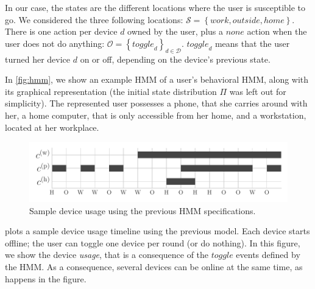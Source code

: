 In our case, the states are the different locations where the user is susceptible to go.
We considered the three following locations: $\mathcal{S}=\left\{ \mathit{work}, \mathit{outside}, \mathit{home} \right\}$. 
There is one action per device $d$ owned by the user, plus a $\mathit{none}$ action when the user does not do anything: 
$\mathcal{O} = \left\{ \mathit{toggle}_d \right\}_{d\in \mathcal{D}}$.
$\mathit{toggle}_d$ means that the user turned her device $d$ on or off, depending on the device's previous state.

In \cref{fig:hmm}, we show an example HMM of a user's behavioral HMM, along with its graphical representation (the initial state distribution $\Pi$ was left out for simplicity). 
The represented user possesses a phone, that she carries around with her, a home computer, that is only accessible from her home, and a workstation, located at her workplace.

\begin{figure}[t]
\centering
\includegraphics[width=\columnwidth]{figures/sample_usage.pdf}

\caption{\label{fig:sample_usage}Sample device usage using the previous HMM specifications. 
}
\end{figure}


 plots a sample device usage timeline using the previous model. 
Each device starts offline; the user can toggle one device per round (or do nothing).
In this figure, we show the device \emph{usage}, that is a consequence of the $\mathit{toggle}$ events defined by the HMM.
As a consequence, several devices can be online at the same time, as happens in the figure.






